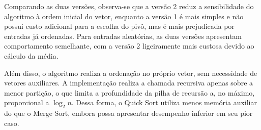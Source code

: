 Comparando as duas versões, observa-se que a versão 2 reduz a
sensibilidade do algoritmo à ordem inicial do vetor, enquanto a versão 1
é mais simples e não possui custo adicional para a escolha do pivô, mas
é mais prejudicada por entradas já ordenadas. Para entradas aleatórias,
as duas versões apresentam comportamento semelhante, com a versão 2
ligeiramente mais custosa devido ao cálculo da média.

Além disso, o algoritmo realiza a ordenação no próprio vetor, sem
necessidade de vetores auxiliares. A implementação realiza a chamada
recursiva apenas sobre a menor partição, o que limita a profundidade da
pilha de recursão a, no máximo, proporcional a $\log_2 n$. Dessa forma,
o Quick Sort utiliza menos memória auxiliar do que o Merge Sort, embora
possa apresentar desempenho inferior em seu pior caso.